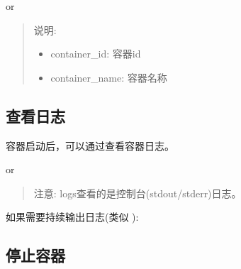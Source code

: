 \documentclass[letterpaper,10pt,english]{sphinxmanual}
\begin{document}
or

\begin{sphinxVerbatim}[commandchars=\\\{\}]
   
\end{sphinxVerbatim}
\begin{quote}

说明:
\begin{itemize}
\item {} 
container\_id: 容器id

\item {} 
container\_name: 容器名称

\end{itemize}
\end{quote}


\subsection{查看日志}
\label{\detokenize{docker/basic_cmd:id15}}
容器启动后，可以通过查看容器日志。

\begin{sphinxVerbatim}[commandchars=\\\{\}]
   
\end{sphinxVerbatim}

or

\begin{sphinxVerbatim}[commandchars=\\\{\}]
   
\end{sphinxVerbatim}
\begin{quote}

注意: logs查看的是控制台(stdout/stderr)日志。
\end{quote}

如果需要持续输出日志(类似 ):

\begin{sphinxVerbatim}[commandchars=\\\{\}]
    
\end{sphinxVerbatim}


\subsection{停止容器}
\label{\detokenize{docker/basic_cmd:id16}}
\begin{sphinxVerbatim}[commandchars=\\\{\}]
   
\end{sphinxVerbatim}
\end{document}
